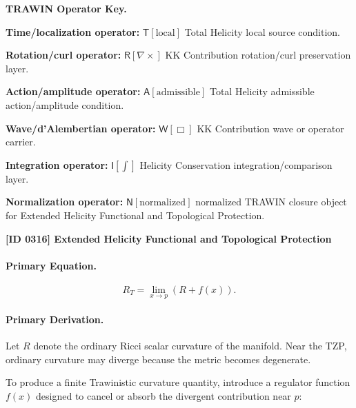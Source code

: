 \par\vspace{0.45\baselineskip}
\noindent\begin{minipage}[t]{\linewidth}
\begingroup
\small
\raggedright
\textbf{TRAWIN Operator Key.}\par
\noindent\textbf{Time/localization operator:} $\mathsf{T}\!\left[\mathrm{local}\right]$ Total Helicity local source condition.\par
\noindent\textbf{Rotation/curl operator:} $\mathsf{R}\!\left[\nabla\times\right]$ KK Contribution rotation/curl preservation layer.\par
\noindent\textbf{Action/amplitude operator:} $\mathsf{A}\!\left[\mathrm{admissible}\right]$ Total Helicity admissible action/amplitude condition.\par
\noindent\textbf{Wave/d'Alembertian operator:} $\mathsf{W}\!\left[\Box\right]$ KK Contribution wave or operator carrier.\par
\noindent\textbf{Integration operator:} $\mathsf{I}\!\left[\int\right]$ Helicity Conservation integration/comparison layer.\par
\noindent\textbf{Normalization operator:} $\mathsf{N}\!\left[\mathrm{normalized}\right]$ normalized TRAWIN closure object for Extended Helicity Functional and Topological Protection.\par
\endgroup
\end{minipage}

\clearpage
\noindent\textbf{[ID 0316] Extended Helicity Functional and Topological Protection}\par
\vspace{0.35em}
\paragraph{Primary Equation.}
\begin{equation}
R_T
=
\lim_{x\to p}
\left(
R+f(x)
\right).
\end{equation}

\paragraph{Primary Derivation.}
Let $R$ denote the ordinary Ricci scalar curvature of the manifold.  
Near the TZP, ordinary curvature may diverge because the metric becomes degenerate.

To produce a finite Trawinistic curvature quantity, introduce a regulator function $f(x)$ designed to cancel or absorb the divergent contribution near $p$:

